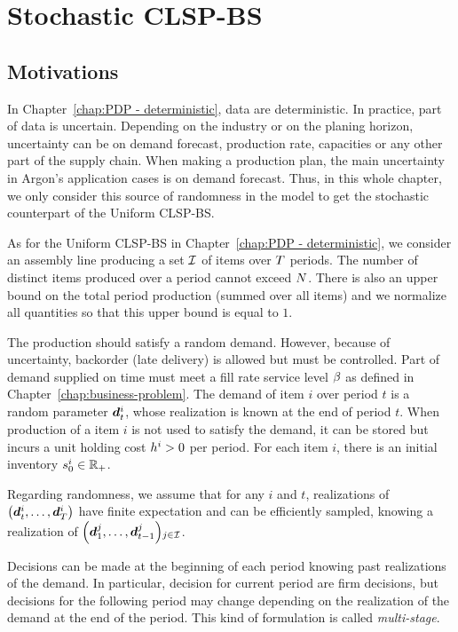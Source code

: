 \chapter{Stochastic CLSP-BS}


\section{Motivations}


In Chapter~\ref{chap:PDP - deterministic}, data are deterministic. In practice, part of data is uncertain. Depending on the industry or on the planing horizon, uncertainty can be on demand forecast, production rate, capacities or any other part of the supply chain. When making a production plan, the main uncertainty in Argon's application cases is on demand forecast. Thus, in this whole chapter, we only consider this source of randomness in the model to get the stochastic counterpart of the Uniform CLSP-BS.


As for the Uniform CLSP-BS in Chapter~\ref{chap:PDP - deterministic}, we consider an assembly line producing a set $\mathcal{I}$ of items over $T$ periods. The number of distinct items produced over a period cannot exceed $N$. There is also an upper bound on the total period production (summed over all items) and we normalize all quantities so that this upper bound is equal to $1$.

The production should satisfy a random demand. However, because of uncertainty, backorder (\ie late delivery) is allowed but must be controlled. Part of demand supplied on time must meet a fill rate service level $\beta$ as defined in Chapter~\ref{chap:business-problem}. The demand of item $i$ over period $t$ is a random parameter $\va\demand_t^i$, whose realization is known at the end of period $t$. When production of a item $i$ is not used to satisfy the demand, it can be stored but incurs a unit holding cost $h^i>0$ per period. For each item $i$, there is an initial inventory $s_0^i\in\mathbb{R}_+$.

Regarding randomness, we assume that for any $i$ and $t$, realizations of $\bracket{\va\demand_t^i,\ldots,\va\demand_{\horizon}^i}$ have finite expectation and can be efficiently sampled, knowing a realization of $\bracket{\va\demand_1^j,\ldots,\va\demand_{t-1}^j}_{j\in\REF}$.

Decisions can be made at the beginning of each period knowing past realizations of the demand. In particular, decision for current period are firm decisions, but decisions for the following period may change depending on the realization of the demand at the end of the period. This kind of formulation is called \emph{multi-stage}.

